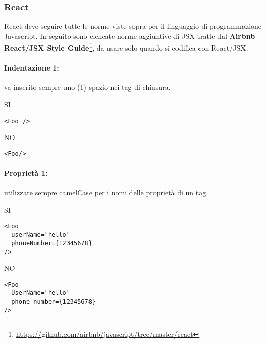 \documentclass[../ProcessiPrimari.tex]{subfiles}
\begin{document}
	
	\subsubsection{React}
	React deve seguire tutte le norme viste sopra per il linguaggio di programmazione Javascript. In seguito sono elencate norme aggiuntive di JSX tratte dal \textbf{Airbnb React/JSX Style Guide}\footnote{\href{https://github.com/airbnb/javascript/tree/master/react}{https://github.com/airbnb/javascript/tree/master/react}}, da usare solo quando si codifica con React/JSX. 

	\paragraph*{Indentazione 1: }
	va inserito sempre uno (1) spazio nei tag di chiusura.	
	\begin{center}{	
			\begin{minipage}{3cm}
				{\begin{center}SI\end{center}}
				\begin{Verbatim}[frame=single]
<Foo />
				\end{Verbatim}
			\end{minipage}
			\hfil
			\begin{minipage}{3cm}
				{\begin{center}NO\end{center}}
				\begin{Verbatim}[frame=single]
<Foo/>
				\end{Verbatim}
			\end{minipage}
		}
	\end{center}	
	\paragraph*{Proprietà 1: }
utilizzare sempre camelCase per i nomi delle proprietà di un tag. 
	\begin{center}{
			\begin{minipage}{6cm}
				{\begin{center}SI\end{center}}
				\begin{Verbatim}[frame=single]
<Foo
  userName="hello"
  phoneNumber={12345678}
/>
				\end{Verbatim}
			\end{minipage}
			\hfil
			\begin{minipage}{6cm}
				{\begin{center}NO\end{center}}
				\begin{Verbatim}[frame=single]
<Foo
  UserName="hello"
  phone_number={12345678}
/>
				\end{Verbatim}
			\end{minipage}
		}
	\end{center}
\end{document}
